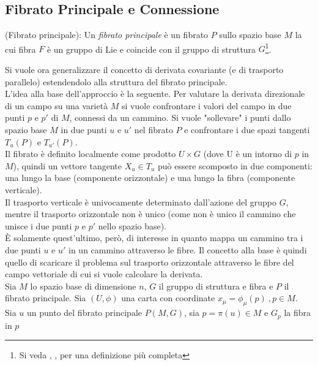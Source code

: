 \subsection{Fibrato Principale e Connessione}
\begin{definition}{(Fibrato principale)}\label{def:principalbundle}:
   Un \emph{fibrato principale} è un fibrato $P$ sullo spazio base $M$ la cui
   fibra $F$ è un gruppo di Lie e coincide con il gruppo di struttura
   $G$\footnote{Si veda \cite{nakahara}, \cite{shnir}, \cite{eguchi}
   per una definizione più completa}.
\end{definition}

Si vuole ora generalizzare il concetto di derivata covariante
(e di trasporto parallelo) estendendolo alla struttura del fibrato principale.\\

L'idea alla base dell'approccio è la seguente.
Per valutare la derivata direzionale di un campo su una varietà $M$ si vuole
confrontare i valori del campo in due punti $p$ e $p'$ di $M$, connessi da un cammino.
Si vuole "sollevare" i punti dallo spazio base $M$ in due punti $u$ e $u'$
nel fibrato $P$ e confrontare i due spazi tangenti $T_u(P)$ e $T_{u'}(P)$.\\
Il fibrato è definito localmente come prodotto $U \times G$
(dove U è un intorno di $p$ in $M$), quindi un vettore tangente $X_u \in T_u$
può essere scomposto in due componenti:
una lungo la base (componente orizzontale) e una lungo la fibra (componente verticale).\\
Il trasporto verticale è univocamente determinato dall'azione del gruppo $G$,
mentre il trasporto orizzontale non è unico
(come non è unico il cammino che unisce i due punti $p$ e $p'$ nello spazio base).\\
È solamente quest'ultimo, però, di interesse in quanto mappa un cammino tra
i due punti $u$ e $u'$ in un cammino attraverso le fibre.
Il concetto alla base è quindi quello di scaricare il problema sul trasporto orizzontale
attraverso le fibre del campo vettoriale di cui si vuole calcolare la derivata.\\

Sia $M$ lo spazio base di dimensione $n$, $G$ il gruppo di struttura e fibra e
$P$ il fibrato principale.
Sia $(U,\phi)$ una carta con coordinate $x_\mu = \phi_\mu(p) \:,p \in M$. \\

Sia $u$ un punto del fibrato principale $P(M,G)$, sia $p = \pi(u) \in M$ e
$G_p$ la fibra in $p$\\

